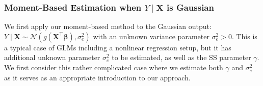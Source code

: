 \documentclass[12pt,reqno]{amsart}
\def\bX{\bm{X}}
\def\bbeta{\bm{\beta}}
\begin{document}
\subsubsection{Moment-Based Estimation when $Y\mid\mathbf{X}$ is Gaussian} \label{sec:moment_regression}

We first apply our moment-based method to the Gaussian output:   ${Y}\mid \bX \sim \mathcal{N}(g(\bX^\top \bbeta),\sigma_{{e}}^2)$ with an unknown variance parameter $\sigma_{{e}}^2>0$. 
This is a typical case of GLMs including a nonlinear regression setup, but it has additional unknown parameter $\sigma_{{e}}^2$ to be estimated, as well as the SS parameter $\gamma$.
We first consider this rather complicated case where we estimate both $\gamma$ and $\sigma_{{e}}^2$ as it serves as an appropriate introduction to our approach.
\end{document}
